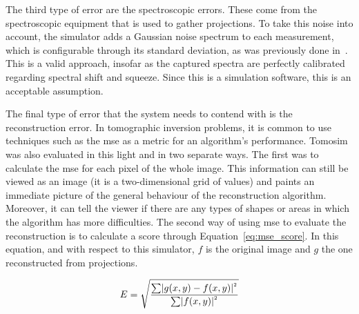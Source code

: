 The third type of error are the spectroscopic errors. These come from
the spectroscopic equipment that is used to gather projections. To take
this noise into account, the simulator adds a Gaussian noise spectrum to
each measurement, which is configurable through its standard deviation,
as was previously done in~\cite{Stutz1996}. This is a valid approach,
insofar as the captured spectra are perfectly calibrated regarding
spectral shift and squeeze. Since this is a simulation software, this is
an acceptable assumption.

The final type of error that the system needs to contend with is the
reconstruction error. In tomographic inversion problems, it is common to
use techniques such as the \gls{mse} as a metric for an algorithm's
performance. Tomosim was also evaluated in this light and in two
separate ways. The first was to calculate the \gls{mse} for each pixel of the
whole image. This information can still be viewed as an image (it is a
two-dimensional grid of values) and paints an immediate picture of the
general behaviour of the reconstruction algorithm. Moreover, it can tell
the viewer if there are any types of shapes or areas in which the
algorithm has more difficulties. The second way of using \gls{mse} to
evaluate the reconstruction is to calculate a score through
Equation~\ref{eq:mse_score}. In this equation, and with respect to this
simulator, $f$ is the original image and $g$ the one reconstructed from
projections.

\begin{equation}
    \centering
    \label{eq:mse_score}
    E = \sqrt{\frac{\sum\lvert g(x,y) - f(x,y)
    \lvert^{^{2}}}{\sum\lvert f(x,y) \lvert ^{^{2}}}}
\end{equation}


